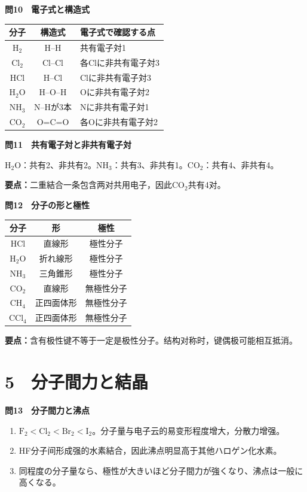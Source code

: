 \documentclass[11pt,a4paper]{ctexart}
\newcommand{\qtitle}[2]{\vspace{2mm}\noindent\textcolor{JapanBlue}{\textbf{問#1　#2}}\par}
\newcommand{\point}[1]{\textcolor{ChinaRed}{\textbf{要点：}}#1}
\begin{document}
\qtitle{10}{電子式と構造式}
\begin{center}
\renewcommand{\arraystretch}{1.5}
\begin{tabular}{c|c|l}
\toprule
分子 & 構造式 & 電子式で確認する点\\ \midrule
$\mathrm{H_2}$ & H--H & 共有電子対1\\
$\mathrm{Cl_2}$ & Cl--Cl & 各Clに非共有電子対3\\
$\mathrm{HCl}$ & H--Cl & Clに非共有電子対3\\
$\mathrm{H_2O}$ & H--O--H & Oに非共有電子対2\\
$\mathrm{NH_3}$ & N--Hが3本 & Nに非共有電子対1\\
$\mathrm{CO_2}$ & O=C=O & 各Oに非共有電子対2\\
\bottomrule
\end{tabular}
\end{center}

\qtitle{11}{共有電子対と非共有電子対}
H$_2$O：共有2、非共有2。NH$_3$：共有3、非共有1。CO$_2$：共有4、非共有4。

\point{二重結合一条包含两对共用电子，因此CO$_2$共有4对。}

\qtitle{12}{分子の形と極性}
\begin{center}
\renewcommand{\arraystretch}{1.35}
\begin{tabular}{c|c|c}
\toprule
分子 & 形 & 極性\\ \midrule
HCl & 直線形 & 極性分子\\
H$_2$O & 折れ線形 & 極性分子\\
NH$_3$ & 三角錐形 & 極性分子\\
CO$_2$ & 直線形 & 無極性分子\\
CH$_4$ & 正四面体形 & 無極性分子\\
CCl$_4$ & 正四面体形 & 無極性分子\\
\bottomrule
\end{tabular}
\end{center}
\point{含有极性键不等于一定是极性分子。结构对称时，键偶极可能相互抵消。}

\section*{5　分子間力と結晶}

\qtitle{13}{分子間力と沸点}
\begin{enumerate}[label=(\arabic*),leftmargin=9mm]
\item $\mathrm{F_2<Cl_2<Br_2<I_2}$。分子量与电子云的易变形程度增大，分散力增强。
\item HF分子间形成强的水素結合，因此沸点明显高于其他ハロゲン化水素。
\item 同程度の分子量なら、極性が大きいほど分子間力が強くなり、沸点は一般に高くなる。
\end{enumerate}
\end{document}
